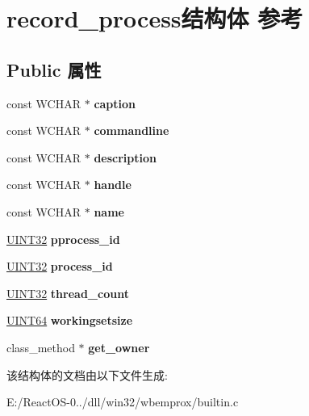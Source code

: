 \hypertarget{structrecord__process}{}\section{record\+\_\+process结构体 参考}
\label{structrecord__process}
\subsection*{Public 属性}
\begin{DoxyCompactItemize}
\item 
\mbox{\label{structrecord__process_a795a55537916aa4ae6d5c9b4c1d4d2ba}} 
const W\+C\+H\+AR $\ast$ {\bfseries caption}
\item 
\mbox{\label{structrecord__process_a45df48e5c48ad516296008ee281d6763}} 
const W\+C\+H\+AR $\ast$ {\bfseries commandline}
\item 
\mbox{\label{structrecord__process_a6ea752a1e2aa885fb153e94f95724159}} 
const W\+C\+H\+AR $\ast$ {\bfseries description}
\item 
\mbox{\label{structrecord__process_a71be1144a7f4c1fd5e7efcb98d6d381e}} 
const W\+C\+H\+AR $\ast$ {\bfseries handle}
\item 
\mbox{\label{structrecord__process_ac9a1b4a586285fba67cd7f84c8b0bdf7}} 
const W\+C\+H\+AR $\ast$ {\bfseries name}
\item 
\mbox{\label{structrecord__process_a5f49ebdd5dacf606679287597ea575e4}} 
\hyperlink{_processor_bind_8h_ae1e6edbbc26d6fbc71a90190d0266018}{U\+I\+N\+T32} {\bfseries pprocess\+\_\+id}
\item 
\mbox{\label{structrecord__process_a2945d1332f6f198d93390c799180773c}} 
\hyperlink{_processor_bind_8h_ae1e6edbbc26d6fbc71a90190d0266018}{U\+I\+N\+T32} {\bfseries process\+\_\+id}
\item 
\mbox{\label{structrecord__process_a61f2464dcaba580394424eb3eb0df1ab}} 
\hyperlink{_processor_bind_8h_ae1e6edbbc26d6fbc71a90190d0266018}{U\+I\+N\+T32} {\bfseries thread\+\_\+count}
\item 
\mbox{\label{structrecord__process_ac5ef697188160e0b26a66642f7ba4394}} 
\hyperlink{_processor_bind_8h_a57be03562867144161c1bfee95ca8f7c}{U\+I\+N\+T64} {\bfseries workingsetsize}
\item 
\mbox{\label{structrecord__process_a28a5cab1012aaf79d39e28c4c4a602a4}} 
class\+\_\+method $\ast$ {\bfseries get\+\_\+owner}
\end{DoxyCompactItemize}


该结构体的文档由以下文件生成\+:\begin{DoxyCompactItemize}
\item 
E\+:/\+React\+O\+S-\/0../dll/win32/wbemprox/builtin.\+c\end{DoxyCompactItemize}
